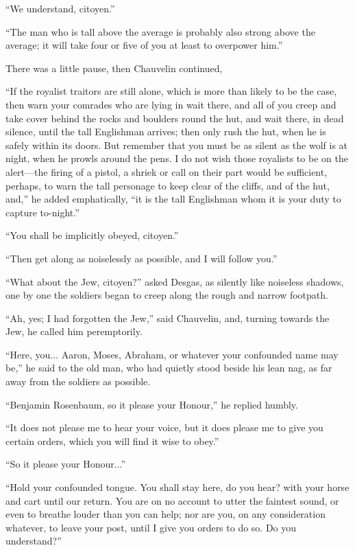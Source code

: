 \enquote{We understand, citoyen.}

\enquote{The man who is tall above the average is probably also strong above the average; it will take four or five of you at least to overpower him.}

There was a little pause, then Chauvelin continued,\longdash


\enquote{If the royalist traitors are still alone, which is more than likely to be the case, then warn your comrades who are lying in wait there, and all of you creep and take cover behind the rocks and boulders round the hut, and wait there, in dead silence, until the tall Englishman arrives; then only rush the hut, when he is safely within its doors. But remember that you must be as silent as the wolf is at night, when he prowls around the pens. I do not wish those royalists to be on the alert---the firing of a pistol, a shriek or call on their part would be sufficient, perhaps, to warn the tall personage to keep clear of the cliffs, and of the hut, and,} he added emphatically, \enquote{it is the tall Englishman whom it is your duty to capture to-night.}

\enquote{You shall be implicitly obeyed, citoyen.}

\enquote{Then get along as noiselessly as possible, and I will follow you.}

\enquote{What about the Jew, citoyen?} asked Desgas, as silently like noiseless shadows, one by one the soldiers began to creep along the rough and narrow footpath.

\enquote{Ah, yes; I had forgotten the Jew,} said Chauvelin, and, turning towards the Jew, he called him peremptorily.

\enquote{Here, you... Aaron, Moses, Abraham, or whatever your confounded name may be,} he said to the old man, who had quietly stood beside his lean nag, as far away from the soldiers as possible.

\enquote{Benjamin Rosenbaum, so it please your Honour,} he replied humbly.

\enquote{It does not please me to hear your voice, but it does please me to give you certain orders, which you will find it wise to obey.}

\enquote{So it please your Honour...}

\enquote{Hold your confounded tongue. You shall stay here, do you hear? with your horse and cart until our return. You are on no account to utter the faintest sound, or even to breathe louder than you can help; nor are you, on any consideration whatever, to leave your post, until I give you orders to do so. Do you understand?}

